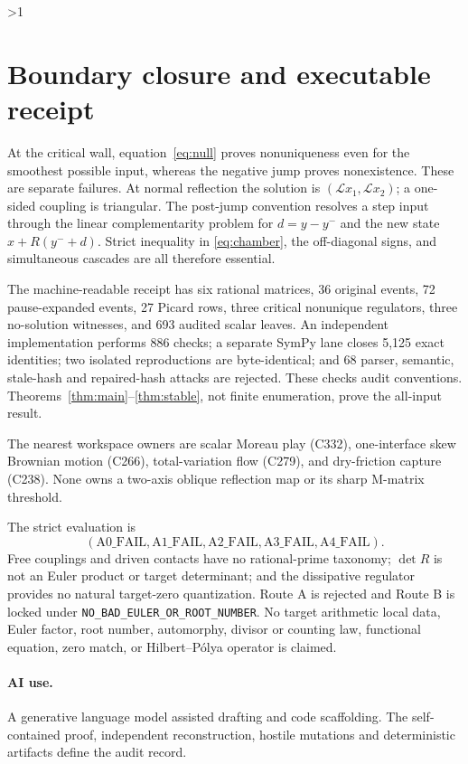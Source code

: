 \documentclass[10pt]{article}
\providecommand{\CRevisionRound}{2}
\newcommand{\calL}{\mathcal L}
\begin{document}
\ifnum\CRevisionRound>1
\section{Boundary closure and executable receipt}
At the critical wall, equation~\eqref{eq:null} proves nonuniqueness even for
the smoothest possible input, whereas the negative jump proves nonexistence.
These are separate failures.  At normal reflection the solution is
$(\calL x_1,\calL x_2)$; a one-sided coupling is triangular.  The post-jump
convention resolves a step input through the linear complementarity problem
for $d=y-y^-$ and the new state $x+R(y^-+d)$.  Strict inequality in
\eqref{eq:chamber}, the off-diagonal signs, and simultaneous cascades are all
therefore essential.

The machine-readable receipt has six rational matrices, 36 original events,
72 pause-expanded events, 27 Picard rows, three critical nonunique regulators,
three no-solution witnesses, and 693 audited scalar leaves.  An independent
implementation performs 886 checks; a separate SymPy lane closes 5,125 exact
identities; two isolated reproductions are byte-identical; and 68 parser,
semantic, stale-hash and repaired-hash attacks are rejected.  These checks
audit conventions.  Theorems~\ref{thm:main}--\ref{thm:stable}, not finite
enumeration, prove the all-input result.

The nearest workspace owners are scalar Moreau play (C332), one-interface
skew Brownian motion (C266), total-variation flow (C279), and dry-friction
capture (C238).  None owns a two-axis oblique reflection map or its sharp
M-matrix threshold.

The strict evaluation is
\[
 (\mathrm{A0\_FAIL},\mathrm{A1\_FAIL},\mathrm{A2\_FAIL},
  \mathrm{A3\_FAIL},\mathrm{A4\_FAIL}).
\]
Free couplings and driven contacts have no rational-prime taxonomy; $\det R$
is not an Euler product or target determinant; and the dissipative regulator
provides no natural target-zero quantization.  Route A is rejected and Route B
is locked under \texttt{NO\_BAD\_EULER\_OR\_ROOT\_NUMBER}.  No target
arithmetic local data, Euler factor, root number, automorphy, divisor or
counting law, functional equation, zero match, or Hilbert--P\'olya operator is
claimed.

\paragraph{AI use.}
A generative language model assisted drafting and code scaffolding.  The
self-contained proof, independent reconstruction, hostile mutations and
deterministic artifacts define the audit record.
\fi
\end{document}
